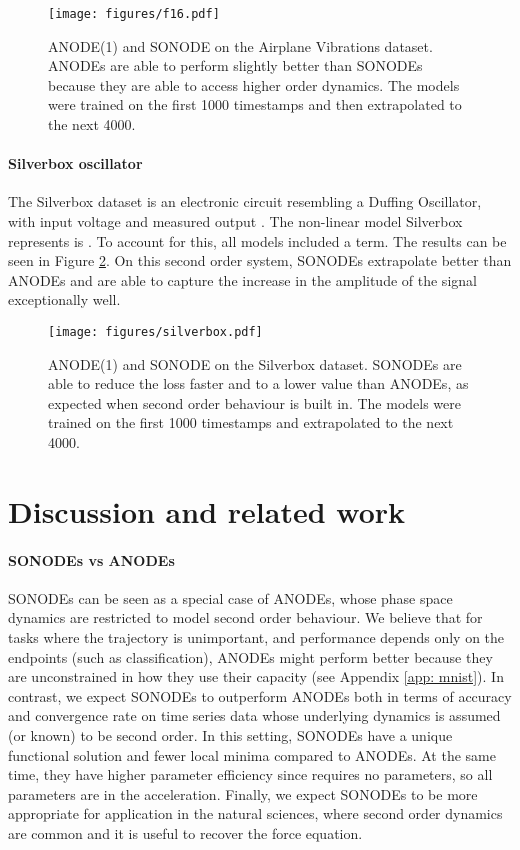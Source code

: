 \documentclass{article}
\theoremstyle{remark}
\theoremstyle{definition}
\begin{document}
\begin{figure}[h]
\centering
    \texttt{[image: figures/f16.pdf]}
    \vspace{-10pt}
    \caption{ANODE(1) and SONODE on the Airplane Vibrations dataset. ANODEs are able to perform slightly better than SONODEs because they are able to access higher order dynamics. The models were trained on the first 1000 timestamps and then extrapolated to the next 4000.}
\label{fig: f16}
\end{figure}



\paragraph{Silverbox oscillator} The Silverbox dataset \cite{6669201} is an electronic circuit resembling a Duffing Oscillator, with input voltage  and measured output . The non-linear model Silverbox represents is . To account for this, all models included a  term. 
The results can be seen in Figure \ref{fig: silverbox}. On this second order system, SONODEs extrapolate better than ANODEs and are able to capture the increase in the amplitude of the signal exceptionally well. 

\begin{figure}[h]
\centering
    \texttt{[image: figures/silverbox.pdf]}
    \vspace{-10pt}
    \caption{ANODE(1) and SONODE on the Silverbox dataset. SONODEs are able to reduce the loss faster and to a lower value than ANODEs, as expected when second order behaviour is built in. The models were trained on the first 1000 timestamps and extrapolated to the next 4000.}
    \vspace{-10pt}
    \label{fig: silverbox}
\end{figure}


\section{Discussion and related work}

\paragraph{SONODEs vs ANODEs} SONODEs can be seen as a special case of ANODEs, whose phase space dynamics are restricted to model second order behaviour. We believe that for tasks where the trajectory is unimportant, and performance depends only on the endpoints (such as classification), ANODEs might perform better because they are unconstrained in how they use their capacity (see Appendix \ref{app: mnist}). In contrast, we expect SONODEs to outperform ANODEs both in terms of accuracy and convergence rate on time series data whose underlying dynamics is assumed (or known) to be second order. In this setting, SONODEs have a unique functional solution and fewer local minima compared to ANODEs. At the same time, they have higher parameter efficiency since  requires no parameters, so all parameters are in the acceleration. Finally, we expect SONODEs to be more appropriate for application in the natural sciences, where second order dynamics are common and it is useful to recover the force equation. 
\end{document}
